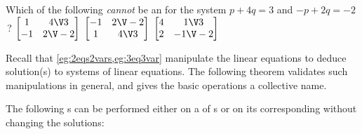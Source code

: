 \begin{activity}
Which of the following \emph{cannot} be an  for the system \(p+4q=3\) and \(-p+2q=-2\)\,?
{\(\begin{bmatrix} 1&4\V3\\-1&2\V-2 \end{bmatrix}\)}
{\(\begin{bmatrix} -1&2\V-2\\1&4\V3 \end{bmatrix}\)}
{\(\begin{bmatrix} 4&1\V3\\2&-1\V-2 \end{bmatrix}\)}
\end{activity}





Recall that \cref{eg:2eqs2vars,eg:3eq3var} manipulate the linear equations to deduce solution(s) to systems of linear equations.
The following theorem validates such manipulations in general, and gives the basic operations a collective name. 


\begin{theorem} \label{thm:erowop} 
The following s can be performed either on a  of s or on its corresponding  without changing the solutions:
\end{theorem}

